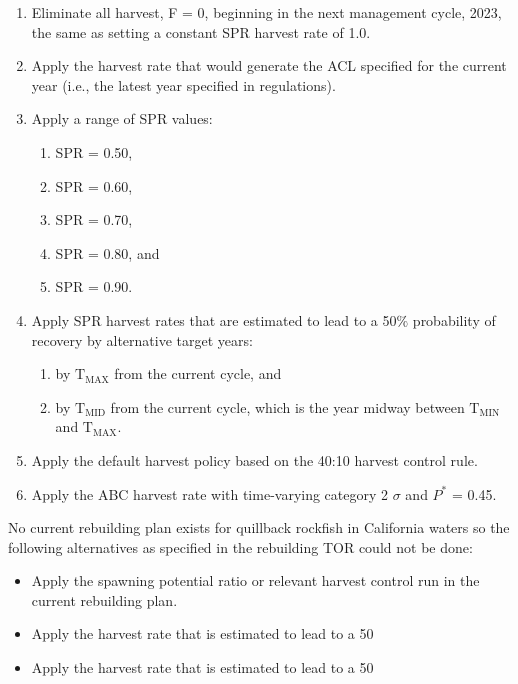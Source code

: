 \documentclass[11pt,
  english,
  a4paper,
]{article}
\begin{document}
\leavevmode\tagmcend\tagstructend\par

\begin{enumerate}
    \item Eliminate all harvest, F = 0, beginning in the next management cycle, 2023, the same as setting a constant SPR harvest rate of 1.0.
    \item Apply the harvest rate that would generate the ACL specified for the current year (i.e., the latest year specified in regulations).
    \item Apply a range of SPR values: 
    \begin{enumerate}
     \item SPR = 0.50,
     \item SPR = 0.60,
     \item SPR = 0.70,
     \item SPR = 0.80, and
     \item SPR = 0.90. 
    \end{enumerate}
    \item Apply SPR harvest rates that are estimated to lead to a 50$\%$ probability of recovery by alternative target years: 
    \begin{enumerate}
     \item by $\text{T}_\text{MAX}$ from the current cycle, and 
     \item by $\text{T}_\text{MID}$ from the current cycle, which is the year midway between $\text{T}_\text{MIN}$ and $\text{T}_\text{MAX}$.
    \end{enumerate}
    \item Apply the default harvest policy based on the 40:10 harvest control rule.
    \item Apply the ABC harvest rate with time-varying category 2 $\sigma$ and $P^*$ = 0.45.
\end{enumerate}


No current rebuilding plan exists for quillback rockfish in California waters so the following alternatives as specified in the rebuilding TOR could not be done:

\leavevmode\tagmcend\tagstructend\par

\begin{itemize}
 \item Apply the spawning potential ratio or relevant harvest control run in the current rebuilding plan. 
 \item Apply the harvest rate that is estimated to lead to a 50%
 \item Apply the harvest rate that is estimated to lead to a 50%
\end{itemize}
\end{document}
